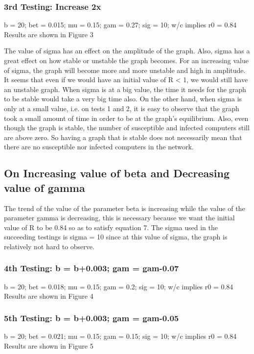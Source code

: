 \documentclass{acm_proc_article-sp}
\begin{document}
\subsubsection{3rd Testing: Increase 2x}
b = 20; bet = 0.015; mu = 0.15; gam = 0.27; sig = 10; w/c implies r0 = 0.84\\
Results are shown in Figure 3

The value of sigma has an effect on the amplitude of the graph. Also, sigma has a great effect on how stable or unstable the graph becomes. For an increasing value of sigma, the graph will become more and more unstable and high in amplitude. It seems that even if we would have an initial value of R < 1, we would still have an unstable graph. When sigma is at a big value, the time it needs for the graph to be stable would take a very big time also. On the other hand, when sigma is only at a small value, i.e. on tests 1 and 2, it is easy to observe that the graph took a small amount of time in order to be at the graph's equilibrium. Also, even though the graph is stable, the number of susceptible and infected computers still are above zero. So having a graph that is stable does not necessarily mean that there are no susceptible nor infected computers in the network.

\subsection{On Increasing value of beta and Decreasing value of gamma}
The trend of the value of the parameter beta is increasing while the value of the parameter gamma is decreasing, this is necessary because we want the initial value of R to be 0.84 so as to satisfy equation 7. The sigma used in the succeeding testings is sigma = 10 since at this value of sigma, the graph is relatively not hard to observe.

\subsubsection{4th Testing: b = b+0.003; gam = gam-0.07}
b = 20; bet = 0.018; mu = 0.15; gam = 0.2; sig = 10; w/c implies r0 = 0.84\\
Results are shown in Figure 4

\subsubsection{5th Testing: b = b+0.003; gam = gam-0.05}
b = 20; bet = 0.021; mu = 0.15; gam = 0.15; sig = 10; w/c implies r0 = 0.84\\
Results are shown in Figure 5
\end{document}
